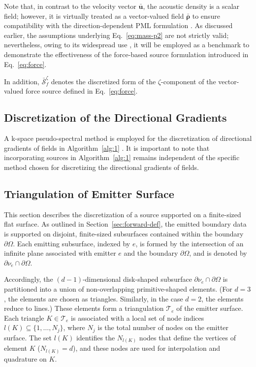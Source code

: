 \documentclass[11pt,reqno]{amsart}
\theoremstyle{remark}
\theoremstyle{italic_lemma}
\newcommand{\bu}{\boldsymbol{u}}
\newcommand{\bro}{\boldsymbol{\rho}}
\begin{document}
Note that, in contrast to the velocity vector \( \bar{\bu} \), the acoustic density is a scalar field; however, it is virtually treated as a vector-valued 
field \( \bar{\bro} \) to ensure compatibility with the direction-dependent PML formulation 
\cite{Mast,Tabei,Treeby}. As discussed earlier, the assumptions underlying Eq.~\eqref{eq:mass-p2} are not strictly valid; nevertheless, owing to its widespread use \cite{Treeby}, it will be employed as a benchmark to demonstrate the effectiveness of the force-based source formulation introduced in Eq.~\eqref{eq:force}.


In addition, \( \bar{\mathcal{S}}_f^\zeta \) denotes the discretized form of the \( \zeta \)-component of the vector-valued force source defined in Eq.~\eqref{eq:force}. 


\subsection{Discretization of the Directional Gradients} \label{sec:grad-dis}

A k-space pseudo-spectral method is employed for the discretization of directional gradients of fields in Algorithm~\ref{alg:1} \cite{Mast,Tabei,Treeby}. It is important to note that incorporating sources in Algorithm~\ref{alg:1} remains independent of the specific method chosen for discretizing the directional gradients of fields.


\subsection{Triangulation of Emitter Surface} 
\label{sec:source-approx}

This section describes the discretization of a source supported on a finite-sized flat surface. As outlined in Section~\ref{sec:forward-def}, the emitted boundary data is supported on disjoint, finite-sized subsurfaces contained within the boundary \( \partial \Omega \). Each emitting subsurface, indexed by \( e \), is formed by the intersection of an infinite plane associated with emitter \( e \) and the boundary \( \partial \Omega \), and is denoted by \( \partial \nu_e \cap \partial \Omega \). 

Accordingly, the \((d{-}1)\)-dimensional disk-shaped subsurface \( \partial \nu_e \cap \partial \Omega \) is partitioned into a union of non-overlapping primitive-shaped elements. (For \( d=3 \), the elements are chosen as triangles. Similarly, in the case \( d=2 \), the elements reduce to lines.) These elements form a triangulation \( \mathcal{T}_e \) of the emitter surface. Each triangle \( K \in \mathcal{T}_e \) is associated with a local set of node indices \( l(K) \subseteq \{1, \dots, N_j\} \), where \( N_j \) is the total number of nodes on the emitter surface. The set \( l(K) \) identifies the \( N_{l(K)} \) nodes that define the vertices of element \( K \) (\(N_{l(K)} =d\)), and these nodes are used for interpolation and quadrature on \( K \). 
\end{document}
